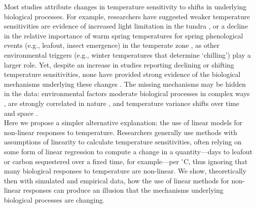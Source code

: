 \documentclass[11pt,letter]{article}
\newcommand{\R}[1]{\label{}\linelabel{#1}} %
\begin{document}
Most studies attribute changes in temperature sensitivity to shifts in underlying biological processes. For example, researchers have suggested weaker temperature sensitivities are evidence of increased light limitation in the tundra \citep{piao2017}, or a decline in the relative importance of warm spring temperatures for spring phenological events (e.g., leafout, insect emergence) in the temperate zone \citep{fu2015,meng2020}, as other environmental triggers (e.g., winter temperatures that determine `chilling') play a larger role. Yet, despite an increase in studies reporting declining or shifting temperature sensitivities, none have provided strong evidence of the biological mechanisms underlying these changes  \citep[e.g.,][]{fu2015,meng2020}. The missing mechanisms may be hidden in the data: environmental factors moderate biological processes in complex ways \citep{chuine2016,gusewell2017}, are strongly correlated in nature \citep[e.g.,][]{fu2015}, and temperature variance shifts over time and space \citep{keenan2019}. \\

Here we propose a simpler alternative explanation: the use of linear models for non-linear responses to temperature. Researchers generally use methods with assumptions of linearity to calculate temperature sensitivities, often relying on some form of linear regression to compute a change in a quantity---days to leafout or carbon sequestered over a fixed time, for example---per $^{\circ}$C, thus ignoring that many biological responses to temperature are non-linear. We show, theoretically then with simulated and empirical data, how the use of linear methods for non-linear responses\R{semantic1} can produce an illusion that the mechanisms underlying biological processes are changing.\\ %
\end{document}
